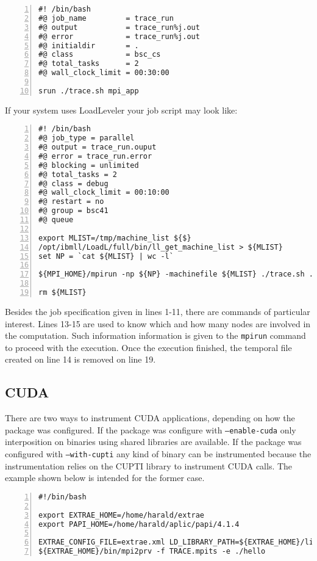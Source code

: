 \begin{Verbatim}[frame=single,numbers=left,labelposition=topline,label=slurm-trace.sh]
#! /bin/bash
#@ job_name         = trace_run
#@ output           = trace_run%j.out
#@ error            = trace_run%j.out
#@ initialdir       = .
#@ class            = bsc_cs
#@ total_tasks      = 2
#@ wall_clock_limit = 00:30:00

srun ./trace.sh mpi_app 
\end{Verbatim}

If your system uses LoadLeveler your job script may look like:

\begin{Verbatim}[frame=single,numbers=left,labelposition=topline,label=ll.sh]
#! /bin/bash
#@ job_type = parallel
#@ output = trace_run.ouput
#@ error = trace_run.error
#@ blocking = unlimited
#@ total_tasks = 2
#@ class = debug
#@ wall_clock_limit = 00:10:00
#@ restart = no
#@ group = bsc41 
#@ queue

export MLIST=/tmp/machine_list ${$}
/opt/ibmll/LoadL/full/bin/ll_get_machine_list > ${MLIST}
set NP = `cat ${MLIST} | wc -l`

${MPI_HOME}/mpirun -np ${NP} -machinefile ${MLIST} ./trace.sh ./mpi-app

rm ${MLIST}
\end{Verbatim}

Besides the job specification given in lines 1-11, there are commands of particular interest. Lines 13-15 are used to know which and how many nodes are involved in the computation. Such information information is given to the {\tt mpirun} command to proceed with the execution. Once the execution finished, the temporal file created on line 14 is removed on line 19.

\subsection{CUDA}\label{subsec:Examples_CUDA}

There are two ways to instrument CUDA applications, depending on how the package was configured. If the package was configure with {\tt --enable-cuda} only interposition on binaries using shared libraries are available. If the package was configured with {\tt --with-cupti} any kind of binary can be instrumented because the instrumentation relies on the CUPTI library to instrument CUDA calls. The example shown below is intended for the former case.

\begin{Verbatim}[frame=single,numbers=left,labelposition=topline,label=run.sh]
#!/bin/bash

export EXTRAE_HOME=/home/harald/extrae
export PAPI_HOME=/home/harald/aplic/papi/4.1.4

EXTRAE_CONFIG_FILE=extrae.xml LD_LIBRARY_PATH=${EXTRAE_HOME}/lib:${PAPI_HOME}/lib:${LD_LIBRARY_PATH} ./hello
${EXTRAE_HOME}/bin/mpi2prv -f TRACE.mpits -e ./hello
\end{Verbatim}

